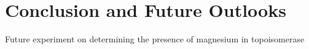 \section{Conclusion and Future Outlooks}

Future experiment on determining the presence of magnesium in topoisomerase